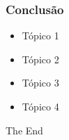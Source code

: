 \documentclass{beamer}
\begin{document}
\begin{frame}
\frametitle{Conclusão}
\begin{itemize}
\item Tópico 1
\item Tópico 2
\item Tópico 3
\item Tópico 4
\end{itemize}
\end{frame}


\begin{frame}
\Huge{\centerline{The End}}
\end{frame}

\end{document}
